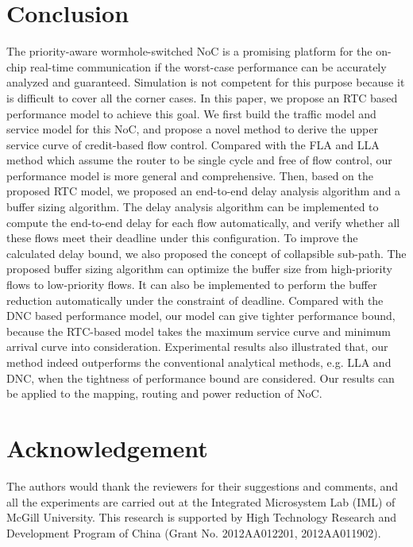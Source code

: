 \documentclass[10pt,journal]{IEEEtran}
\begin{document}
\section{Conclusion}\label{conclusion}
The priority-aware wormhole-switched NoC is a promising platform for the on-chip real-time communication if the worst-case performance can be accurately analyzed and guaranteed. Simulation is not competent for this purpose because it is difficult to cover all the corner cases. In this paper, we propose an RTC based performance model to achieve this goal. We first build the traffic model and service model for this NoC, and propose a novel method to derive the upper service curve of credit-based flow control. Compared with the FLA and LLA method which assume the router to be single cycle and free of flow control, our performance model is more general and comprehensive. Then, based on the proposed RTC model, we proposed an end-to-end delay analysis algorithm and a buffer sizing algorithm. The delay analysis algorithm can be implemented to compute the end-to-end delay for each flow automatically, and verify whether all these flows meet their deadline under this configuration. To improve the calculated delay bound, we also proposed the concept of collapsible sub-path. The proposed buffer sizing algorithm can optimize the buffer size from high-priority flows to low-priority flows. It can also be implemented to perform the buffer reduction automatically under the constraint of deadline. Compared with the DNC based performance model, our model can give tighter performance bound, because the RTC-based model takes the maximum service curve and minimum arrival curve into consideration. Experimental results also illustrated that, our method indeed outperforms the conventional analytical methods, e.g. LLA and DNC, when the tightness of performance bound are considered. Our results can be applied to the mapping, routing and power reduction of NoC.

\section*{Acknowledgement}
The authors would thank the reviewers for their suggestions and comments, and all the experiments are carried out at the Integrated Microsystem Lab (IML) of McGill University. This research is supported by High Technology Research and Development Program of China (Grant No. 2012AA012201, 2012AA011902).



\end{document}
